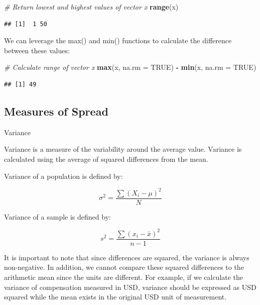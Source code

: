 \documentclass[]{book}
\newenvironment{Shaded}{\begin{snugshade}}{\end{snugshade}}
\newcommand{\CommentTok}[1]{\textcolor[rgb]{0.56,0.35,0.01}{\textit{#1}}}
\newcommand{\DataTypeTok}[1]{\textcolor[rgb]{0.13,0.29,0.53}{#1}}
\newcommand{\KeywordTok}[1]{\textcolor[rgb]{0.13,0.29,0.53}{\textbf{#1}}}
\newcommand{\NormalTok}[1]{#1}
\newcommand{\OperatorTok}[1]{\textcolor[rgb]{0.81,0.36,0.00}{\textbf{#1}}}
\newcommand{\OtherTok}[1]{\textcolor[rgb]{0.56,0.35,0.01}{#1}}
\newcommand{\StringTok}[1]{\textcolor[rgb]{0.31,0.60,0.02}{#1}}
\begin{document}
\begin{Shaded}
\begin{Highlighting}[]
\CommentTok{# Return lowest and highest values of vector x}
\KeywordTok{range}\NormalTok{(x)}
\end{Highlighting}
\end{Shaded}

\begin{verbatim}
## [1]  1 50
\end{verbatim}

We can leverage the max() and min() functions to calculate the difference between these values:

\begin{Shaded}
\begin{Highlighting}[]
\CommentTok{# Calculate range of vector x}
\KeywordTok{max}\NormalTok{(x, }\DataTypeTok{na.rm =} \OtherTok{TRUE}\NormalTok{) }\OperatorTok{-}\StringTok{ }\KeywordTok{min}\NormalTok{(x, }\DataTypeTok{na.rm =} \OtherTok{TRUE}\NormalTok{)}
\end{Highlighting}
\end{Shaded}

\begin{verbatim}
## [1] 49
\end{verbatim}

\hypertarget{measures-of-spread}{%
\subsection{Measures of Spread}\label{measures-of-spread}}

Variance

Variance is a measure of the variability around the average value. Variance is calculated using the average of squared differences from the mean.

Variance of a population is defined by:

\[ \sigma^{2} = \frac{\sum (X_{i}-\mu)^{2}}{N} \]

Variance of a sample is defined by:

\[ s^{2} = \frac{\sum (x_{i}-\bar{x})^{2}}{n-1} \]

It is important to note that since differences are squared, the variance is always non-negative. In addition, we cannot compare these squared differences to the arithmetic mean since the units are different. For example, if we calculate the variance of compensation measured in USD, variance should be expressed as USD squared while the mean exists in the original USD unit of measurement.
\end{document}
